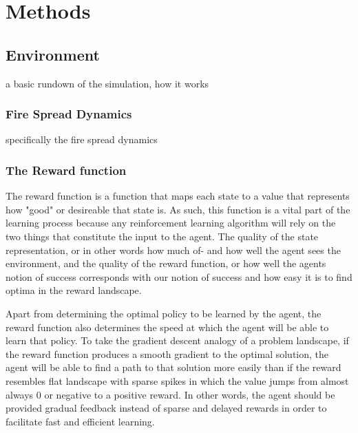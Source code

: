 
\section{Methods}\label{sec:methods}

\subsection{Environment}\label{sec:environment}
a basic rundown of the simulation, how it works

\subsubsection{Fire Spread Dynamics}\label{sec:fire_spread}
specifically the fire spread dynamics

\subsubsection{The Reward function}\label{sec:reward_function}
The reward function is a function that maps each state to a value that represents how "good" or desireable that state is. As such, this function is a vital part of the learning process because any reinforcement learning algorithm will rely on the two things that constitute the input to the agent. The quality of the state representation, or in other words how much of- and how well the agent sees the environment, and the quality of the reward function, or how well the agents notion of success corresponds with our notion of success and how easy it is to find optima in the reward landscape.

Apart from determining the optimal policy to be learned by the agent, the reward function also determines the speed at which the agent will be able to learn that policy. To take the gradient descent analogy of a problem landscape, if the reward function produces a smooth gradient to the optimal solution, the agent will be able to find a path to that solution more easily than if the reward resembles flat landscape with sparse spikes in which the value jumps from almost always 0 or negative to a positive reward. In other words, the agent should be provided gradual feedback instead of sparse and delayed rewards in order to facilitate fast and efficient learning.


